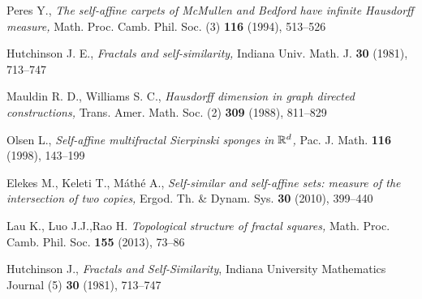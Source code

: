 \begin{thebibliography}{99}
    {\sc Peres Y.,}
    {\em The self-affine carpets of McMullen and Bedford have infinite Hausdorff measure,}
    {Math. Proc. Camb. Phil. Soc. (3) \textbf{116} (1994), 513--526}

    {\sc Hutchinson J. E.,}
    {\em Fractals and self-similarity,}
    {Indiana Univ. Math. J. \textbf{30} (1981), 713--747}

    {\sc Mauldin R. D., Williams S. C.,}
    {\em Hausdorff dimension in graph directed constructions,}
    {Trans. Amer. Math. Soc. (2) \textbf{309} (1988), 811--829}

    {\sc Olsen L.,}
    {\em Self-affine multifractal Sierpinski sponges in $\mathbb{R}^d$,}
    {Pac. J. Math. \textbf{116} (1998), 143--199}

    {\sc Elekes M., Keleti T., M\'ath\'e A.,}
    {\em Self-similar and self-affine sets: measure of the intersection of two copies,}
    {Ergod. Th. \& Dynam. Sys. \textbf{30} (2010), 399--440}

    {\sc Lau K., Luo J.J.,Rao H.}
    {\em Topological structure of fractal squares,}
    {Math. Proc. Camb. Phil. Soc. \textbf{155} (2013), 73--86}

    {\sc Hutchinson J.},
    {\em Fractals and Self-Similarity},
    {Indiana University Mathematics Journal (5) \textbf{30} (1981), 713--747}

\end{thebibliography}